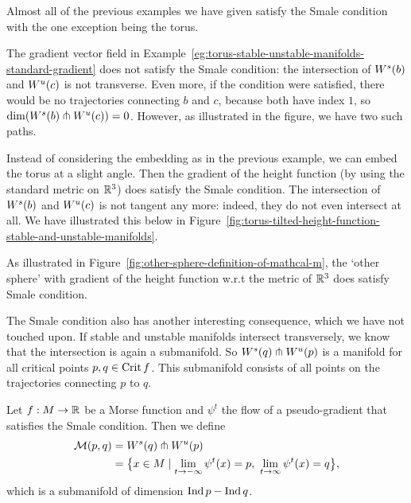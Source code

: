     Almost all of the previous examples we have given satisfy the Smale condition with the one exception being the torus.
    \begin{noneg}
        The gradient vector field in Example~\ref{eg:torus-stable-unstable-manifolds-standard-gradient} does not satisfy the Smale condition: the intersection of $W^s(b)$ and  $W^u(c)$ is not transverse.
        Even more, if the condition were satisfied, there would be no trajectories connecting $b$ and $c$, because both have index $1$, so $\dim (W^s(b) \pitchfork W^u(c)) = 0$. However, as illustrated in the figure, we have two such paths.
    \end{noneg}
    \begin{eg}
        Instead of considering the embedding as in the previous example, we can embed the torus at a slight angle.
        Then the gradient of the height function (by using the standard metric on $\mathbb{R}^3$) does satisfy the Smale condition.
        The intersection of $W^s(b)$ and  $W^u(c)$ is not tangent any more: indeed, they do not even intersect at all. We have illustrated this below in Figure~\ref{fig:torus-tilted-height-function-stable-and-unstable-manifolds}.
        \label{eg:tilted-torus}
    \end{eg}
    \begin{figure}[H]
        \centering
    \end{figure}
    \begin{eg}
        As illustrated in Figure~\ref{fig:other-sphere-definition-of-mathcal-m}, the `other sphere' with gradient of the height function w.r.t the metric of $\mathbb{R}^3$ does satisfy Smale condition.  \end{eg}

The Smale condition also has another interesting consequence, which we have not touched upon.
If stable and unstable manifolds intersect transversely, we know that the intersection is again a submanifold.
So $W^s(q) \pitchfork W^u(p)$ is a manifold for all critical points $p, q \in \operatorname{Crit} f$.
This submanifold consists of all points on the trajectories connecting $p$ to $q$.
 \begin{definition}
    Let $f: M \to  \mathbb{R}$ be a Morse function and $\psi^{t}$ the flow of a pseudo-gradient that satisfies the Smale condition.
    Then we define
    \begin{align*}
        \traj{p}{q} &= \stable{q} \tcap \unstable{p}\\
                    &= \big\{
            x \in M 
            \mid 
            \lim_{t \to -\infty} \psi^{t}(x) = p, \ 
            \lim_{t \to \infty} \psi^{t}(x) = q
        \big\} 
    ,\end{align*} 
    which is a submanifold of dimension $\operatorname{Ind} p - \operatorname{Ind} q$.
\end{definition}

